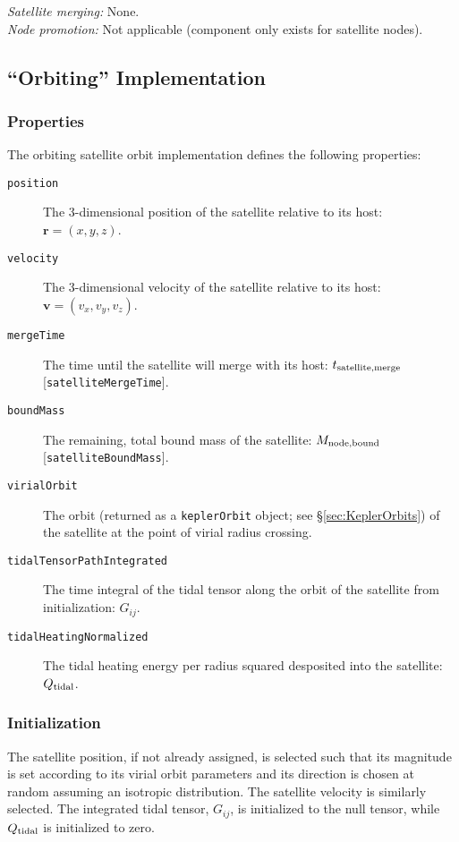 \noindent\emph{Satellite merging:} None.\\

\noindent\emph{Node promotion:} Not applicable (component only exists for satellite nodes).\\

\subsection{``Orbiting'' Implementation}

\subsubsection{Properties}

The orbiting satellite orbit implementation defines the following properties:
\begin{description}
 \item [{\tt position}] The 3-dimensional position of the satellite relative to its host: $\mathbf{r}=(x,y,z)$.
 \item [{\tt velocity}] The 3-dimensional velocity of the satellite relative to its host: $\mathbf{v}=(v_x,v_y,v_z)$.
 \item [{\tt mergeTime}] The time until the satellite will merge with its host: $t_{\rm satellite, merge}$ [{\tt satelliteMergeTime}].
 \item [{\tt boundMass}] The remaining, total bound mass of the satellite: $M_{\rm node,bound}$ [{\tt satelliteBoundMass}].
 \item[{\tt virialOrbit}] The orbit (returned as a {\tt keplerOrbit} object; see \S\ref{sec:KeplerOrbits}) of the satellite at the point of virial radius crossing.
 \item[{\tt tidalTensorPathIntegrated}] The time integral of the tidal tensor along the orbit of the satellite from initialization: $G_{ij}$.
 \item[{\tt tidalHeatingNormalized}] The tidal heating energy per radius squared desposited into the satellite: $Q_{\rm tidal}$.
\end{description}

\subsubsection{Initialization}

The satellite position, if not already assigned, is selected such that its magnitude is set according to its virial orbit parameters and its direction is chosen at random assuming an isotropic distribution.  The satellite velocity is similarly selected.  The integrated tidal tensor, $G_{ij}$, is initialized to the null tensor, while $Q_{\rm tidal}$ is initialized to zero.

